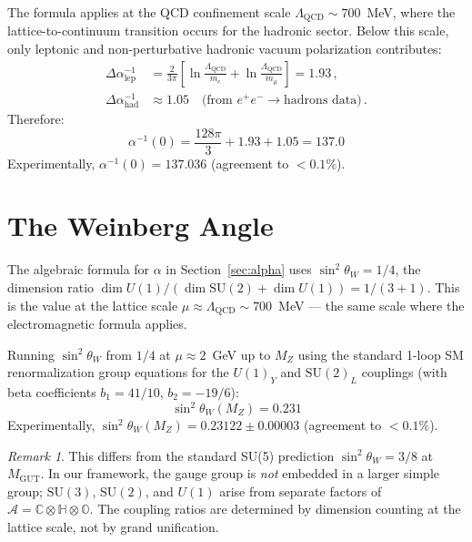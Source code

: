\documentclass[12pt,a4paper]{article}
\theoremstyle{definition}
\theoremstyle{remark}
\newtheorem{remark}[theorem]{Remark}
\newcommand{\Oct}{\mathbb{O}}
\newcommand{\Quat}{\mathbb{H}}
\newcommand{\Comp}{\mathbb{C}}
\newcommand{\Alg}{\mathcal{A}}
\newcommand{\SU}{\mathrm{SU}}
\begin{document}
The formula applies at the QCD confinement scale $\Lambda_{\text{QCD}} \sim 700$~MeV, 
where the lattice-to-continuum transition occurs for the hadronic sector. 
Below this scale, only leptonic and non-perturbative hadronic vacuum 
polarization contributes:
\begin{align}
\Delta\alpha^{-1}_{\text{lep}} &= \frac{2}{3\pi}\left[
\ln\frac{\Lambda_{\text{QCD}}}{m_e} + \ln\frac{\Lambda_{\text{QCD}}}{m_\mu}
\right] = 1.93\,, \\
\Delta\alpha^{-1}_{\text{had}} &\approx 1.05 \quad 
\text{(from $e^+e^-\to\text{hadrons}$ data)}\,.
\end{align}
Therefore:
\begin{equation}
\boxed{\alpha^{-1}(0) = \frac{128\pi}{3} + 1.93 + 1.05 = 137.0}
\end{equation}
Experimentally, $\alpha^{-1}(0) = 137.036$ (agreement to $< 0.1\%$).

\section{The Weinberg Angle}
\label{sec:weinberg}

The algebraic formula for $\alpha$ in Section~\ref{sec:alpha} uses 
$\sin^2\theta_W = 1/4$, the dimension ratio 
$\dim U(1)/(\dim\SU(2) + \dim U(1)) = 1/(3+1)$. This is the value at the 
lattice scale $\mu \approx \Lambda_{\text{QCD}} \sim 700$~MeV --- the same scale 
where the electromagnetic formula applies.

Running $\sin^2\theta_W$ from $1/4$ at $\mu \approx 2$~GeV up to $M_Z$ using 
the standard 1-loop SM renormalization group equations for the $U(1)_Y$ and 
$\SU(2)_L$ couplings (with beta coefficients $b_1 = 41/10$, $b_2 = -19/6$):
\begin{equation}
\boxed{\sin^2\theta_W(M_Z) = 0.231}
\end{equation}
Experimentally, $\sin^2\theta_W(M_Z) = 0.23122 \pm 0.00003$ 
(agreement to $< 0.1\%$).

\begin{remark}
This differs from the standard SU(5) prediction $\sin^2\theta_W = 3/8$ at 
$M_{\text{GUT}}$. In our framework, the gauge group is \emph{not} embedded 
in a larger simple group; $\SU(3)$, $\SU(2)$, and $U(1)$ arise from separate 
factors of $\Alg = \Comp\otimes\Quat\otimes\Oct$. The coupling ratios are 
determined by dimension counting at the lattice scale, not by grand unification.
\end{remark}
\end{document}
